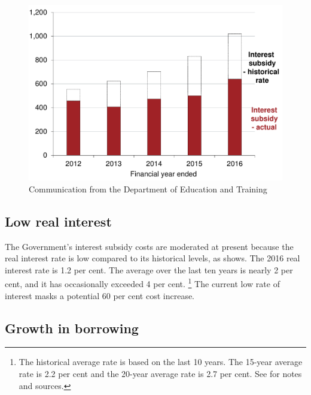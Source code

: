 \documentclass[embargoed]{grattan}
\begin{document}
\begin{figure}
\begin{minipage}[t][\textheight]{\columnwidth}
\includegraphics[page=3]{atlas/Chartpack.pdf}
%
{Communication from the Department of Education and Training}
\end{minipage}
\end{figure}

\subsection{Low real interest}\label{low-real-interest}

The Government's interest subsidy costs are moderated at present because the real interest rate is low compared to its historical levels, as  shows.
The 2016 real interest rate is 1.2 per cent.
The average over the last ten years is nearly 2 per cent, and it has occasionally exceeded 4 per cent.%
\footnote{The historical average rate is based on the last 10 years.
The 15-year average rate is 2.2 per cent and the 20-year average rate is 2.7 per cent. See   for notes and sources.
} The current low rate of interest masks a potential 60 per cent cost increase.

\subsection{Growth in borrowing}\label{subsec:growth-in-borrowing} 
\end{document}
